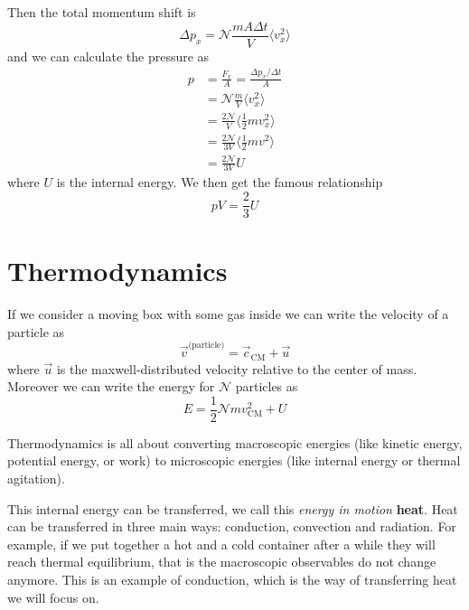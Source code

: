 \documentclass[14pt]{extarticle}
\newcommand{\anglebraces}[1]{
    \langle #1 \rangle
}
\begin{document}
Then the total momentum shift is
\begin{equation}
    \Delta p_x = \mathscr{N} \frac{m A \Delta t}{V} \anglebraces{v_x^2}
\end{equation}
and we can calculate the pressure as
\begin{align}
    p & = \frac{F_x}{A} = \frac{\Delta p_x / \Delta t}{A}          \\
      & = \mathscr{N} \frac{m}{V} \anglebraces{v_x^2}              \\
      & = \frac{2 \mathscr{N}}{V} \anglebraces{\frac{1}{2}m v_x^2} \\
      & = \frac{2 \mathscr{N}}{3 V} \anglebraces{\frac{1}{2}m v^2} \\
      & = \frac{2 \mathscr{N}}{3 V} U
\end{align}
where $U$ is the internal energy. We then get the famous relationship
\begin{equation}
    \label{eq:gas:internal_energy}
    pV = \frac{2}{3}U
\end{equation}

\section{Thermodynamics}

If we consider a moving box with some gas inside we can write the velocity of a particle as
\begin{equation}
    \vec v^{\text{(particle)}} = \vec c_{\text{CM}} + \vec u
\end{equation}
where $\vec u$ is the maxwell-distributed velocity relative to the center of mass.
Moreover we can write the energy for $\mathscr{N}$ particles as
\begin{equation}
    E = \frac{1}{2} \mathscr{N} m v_{\text{CM}}^2 + U
\end{equation}

Thermodynamics is all about converting macroscopic energies (like kinetic energy, potential energy, or work) to microscopic energies (like internal energy or thermal agitation).

This internal energy can be transferred, we call this \emph{energy in motion} \textbf{heat}.
Heat can be transferred in three main ways: conduction, convection and radiation.
For example, if we put together a hot and a cold container after a while they will reach thermal equilibrium, that is the macroscopic observables do not change anymore.
This is an example of conduction, which is the way of transferring heat we will focus on.
\end{document}
